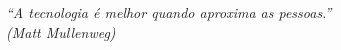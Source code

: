 \begin{epigrafe}
    \vspace*{\fill}
	\begin{flushright}
		\textit{``A tecnologia é melhor quando aproxima as pessoas.''\\
		(Matt Mullenweg)}
	\end{flushright}
\end{epigrafe}

